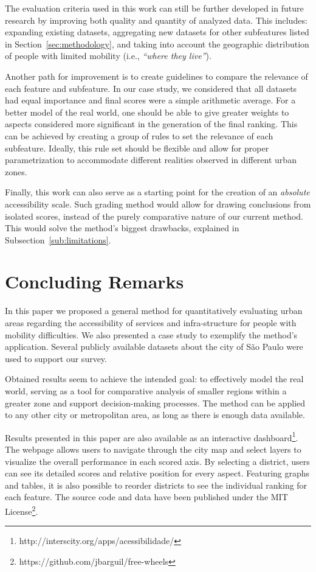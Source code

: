 \documentclass[12pt]{article}
\begin{document}
The evaluation criteria used in this work can still be further developed in future research
by improving both quality and quantity of analyzed data.
This includes:
expanding existing datasets,
aggregating new datasets for other subfeatures listed in Section~\ref{sec:methodology},
and taking into account the geographic distribution of people with limited mobility (i.e., \emph{``where they live''}).

Another path for improvement
is to create guidelines to compare the relevance of each feature and subfeature.
In our case study, we considered that all datasets had equal importance
and final scores were a simple arithmetic average.
For a better model of the real world,
one should be able to give greater weights to aspects considered more significant
in the generation of the final ranking.
This can be achieved by creating a group of rules to set the relevance of each subfeature.
Ideally, this rule set should be flexible and allow for proper parametrization to accommodate different realities observed in different urban zones.

Finally, this work can also serve as a starting point for the creation of an \emph{absolute} accessibility scale.
Such grading method would allow for drawing conclusions from isolated scores,
instead of the purely comparative nature of our current method.
This would solve the method's biggest drawbacks, explained in Subsection~\ref{sub:limitations}.

\section{Concluding Remarks}
\label{sec:conclusion}

In this paper we proposed a general method for
quantitatively evaluating urban areas regarding the accessibility of services and infra-structure for people with mobility difficulties.
We also presented a case study to exemplify the method's application.
Several publicly available datasets about the city of São Paulo were used to support our survey.

Obtained results seem to achieve the intended goal:
to effectively model the real world,
serving as a tool for comparative analysis of smaller regions within a greater zone
and support decision-making processes.
The method can be applied to any other city or metropolitan area,
as long as there is enough data available.

Results presented in this paper are also available as an interactive dashboard\footnote{http://interscity.org/apps/acessibilidade/}.
The webpage allows users to navigate through the city map and
select layers to visualize the overall performance in each scored axis.
By selecting a district, users can see its detailed scores and relative position for every aspect.
Featuring graphs and tables,
it is also possible to reorder districts to see the individual ranking for each feature.
The source code and data have been published under the MIT License\footnote{https://github.com/jbarguil/free-wheels}.
\end{document}
